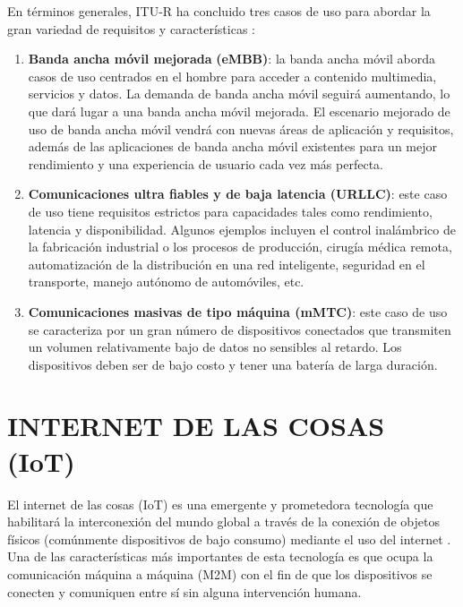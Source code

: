 En términos generales, ITU-R ha concluido tres casos de uso para abordar la gran variedad de requisitos y características \parencite{5gMobileComms}:


\begin{enumerate}
    \item \textbf{Banda ancha móvil mejorada} \textbf{(eMBB)}: la banda ancha móvil aborda casos de uso centrados en el hombre para acceder a contenido multimedia, servicios y datos. La demanda de banda ancha móvil seguirá aumentando, lo que dará lugar a una banda ancha móvil mejorada. El escenario mejorado de uso de banda ancha móvil vendrá con nuevas áreas de aplicación y requisitos, además de las aplicaciones de banda ancha móvil existentes para un mejor rendimiento y una experiencia de usuario cada vez más perfecta.
    \item \textbf{Comunicaciones ultra fiables y de baja latencia (URLLC)}: este caso de uso tiene requisitos estrictos para capacidades tales como rendimiento, latencia y disponibilidad. Algunos ejemplos incluyen el control inalámbrico de la fabricación industrial o los procesos de producción, cirugía médica remota, automatización de la distribución en una red inteligente, seguridad en el transporte, manejo autónomo de automóviles, etc.
    \item \textbf{Comunicaciones masivas de tipo máquina (mMTC)}: este caso de uso se caracteriza por un gran número de dispositivos conectados que transmiten un volumen relativamente bajo de datos no sensibles al retardo. Los dispositivos deben ser de bajo costo y tener una batería de larga duración.
\end{enumerate}



\section{INTERNET DE LAS COSAS (IoT)}

El internet de las cosas (IoT) es una emergente y prometedora tecnología que habilitará la interconexión del mundo global a través de la conexión de objetos físicos (comúnmente dispositivos de bajo consumo) mediante el uso del internet \parencite{5GSurveyAkpaku}. Una de las características más importantes de esta tecnología es que ocupa la comunicación máquina a máquina (M2M) con el fin de que los dispositivos se conecten y comuniquen entre sí sin alguna intervención humana.\newline

